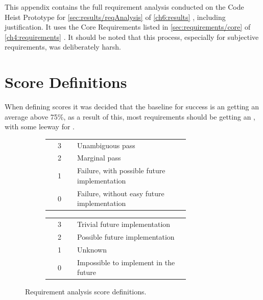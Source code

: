 
This appendix contains the full requirement analysis conducted on the Code Heist Prototype for \autoref{sec:results/reqAnalysis} of \autoref{ch6:results} , including justification. It uses the Core Requirements listed in \autoref{sec:requirements/core} of \autoref{ch4:requirements} . It should be noted that this process, especially for subjective requirements, was deliberately harsh.

\section{Score Definitions}

When defining scores it was decided that the baseline for success is an getting an average above 75\%, as a result of this, most requirements should be getting an , with some leeway for .

\begin{figure}[H]
  \centering
  \begin{subfigure}[t]{0.5\linewidth}
    \centering
    \begin{tabular}{cp{0.8\linewidth}}\toprule
        3 & Unambiguous pass \\
        2 & Marginal pass \\
        1 & Failure, with possible future implementation \\
        0 & Failure, without easy future implementation
    \\ \bottomrule\end{tabular}
  \end{subfigure}
  \hfill
  \begin{subfigure}[t]{0.45\linewidth}
    \centering
    \begin{tabular}{cp{0.8\linewidth}}\toprule
        3 & Trivial future implementation \\
        2 & Possible future implementation \\
        1 & Unknown \\
        0 & Impossible to implement in the future
    \\ \bottomrule\end{tabular}
  \end{subfigure}
  \caption[Requirement analysis score definitions]{Requirement analysis score definitions.}
  \label{tab:app-results/passCriteria}
\end{figure}

